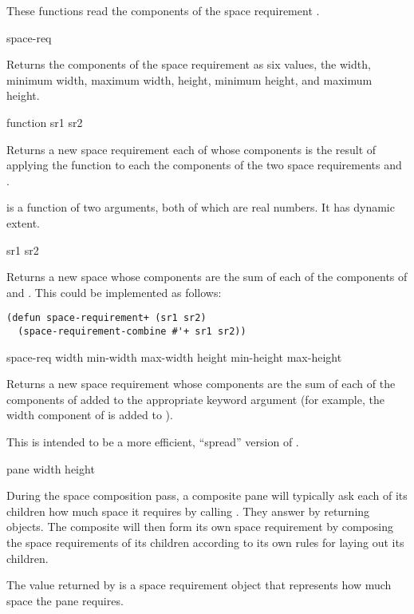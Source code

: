 These functions read the components of the space requirement .

 {space-req}

Returns the components of the space requirement  as six values,
the width, minimum width, maximum width, height, minimum height, and maximum
height.

 {function sr1 sr2}

Returns a new space requirement each of whose components is the result of
applying the function  to each the components of the two space
requirements  and .

 is a function of two arguments, both of which are real numbers.
It has dynamic extent.

 {sr1 sr2}

Returns a new space whose components are the sum of each of the components of
 and .  This could be implemented as follows:

\begin{verbatim}
(defun space-requirement+ (sr1 sr2)
  (space-requirement-combine #'+ sr1 sr2))
\end{verbatim}

 {space-req \key width min-width max-width
                                             height min-height max-height}
                             
Returns a new space requirement whose components are the sum of each of the
components of  added to the appropriate keyword argument (for
example, the width component of  is added to ).

This is intended to be a more efficient, ``spread'' version of
.


 {pane \key width height} 

During the space composition pass, a composite pane will typically ask each of
its children how much space it requires by calling .  They
answer by returning  objects.  The composite will then
form its own space requirement by composing the space requirements of its
children according to its own rules for laying out its children.

The value returned by  is a space requirement object that
represents how much space the pane  requires.

